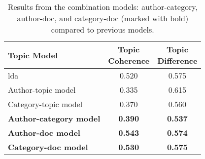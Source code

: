 \begin{table}[h]
	\centering
	\caption{Results from the combination models: author-category, author-doc, and category-doc (marked with bold) compared to previous models.}
	\begin{tabular}{l|c|c}
		Topic Model & \makecell{Topic \\ Coherence} & \makecell{Topic \\ Difference} \\
		\midrule
		\Acrlong{lda} & 0.520 & 0.575 \\
		Author-topic model & 0.335 & 0.615 \\
		Category-topic model & 0.370 & 0.560 \\
		\textbf{Author-category model} & \textbf{0.390} & \textbf{0.537} \\
		\textbf{Author-doc model} & \textbf{0.543} & \textbf{0.574} \\
		\textbf{Category-doc model} &\textbf{ 0.530} & \textbf{0.575} \\
	\end{tabular}
	\label{tab:_extra_metric_results}
\end{table}

